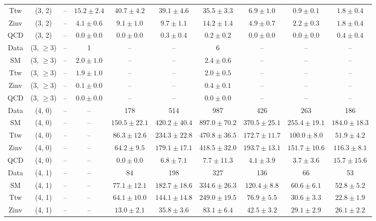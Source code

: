 \begin{table}[h!]
{\begin{tabular}{cccccccccc}
	Ttw & (3, 2) & -- & $15.2\pm 2.4$ & $40.7\pm 4.2$ & $39.1\pm 4.6$ & $35.5\pm 3.3$ & $6.9\pm 1.0$ & $0.9\pm 0.1$ & $1.8\pm 0.4$ \\[0.5ex] 
	Zinv & (3, 2) & -- & $4.1\pm 0.6$ & $9.1\pm 1.0$ & $9.7\pm 1.1$ & $14.2\pm 1.4$ & $4.9\pm 0.7$ & $2.2\pm 0.3$ & $1.8\pm 0.4$ \\[0.5ex] 
	QCD & (3, 2) & -- & $0.0\pm 0.0$ & $0.0\pm 0.0$ & $0.3\pm 0.4$ & $0.2\pm 0.2$ & $0.0\pm 0.0$ & $0.0\pm 0.0$ & $0.4\pm 0.4$ \\[0.5ex] 
	Data & (3, $\ge3$) & -- & 1 & -- & -- & 6 & -- & -- & -- \\[0.5ex] 
	SM & (3, $\ge3$) & -- & $2.0\pm 1.0$ & -- & -- & $2.4\pm 0.6$ & -- & -- & -- \\[0.5ex] 
	Ttw & (3, $\ge3$) & -- & $1.9\pm 1.0$ & -- & -- & $2.0\pm 0.5$ & -- & -- & -- \\[0.5ex] 
	Zinv & (3, $\ge3$) & -- & $0.1\pm 0.0$ & -- & -- & $0.4\pm 0.1$ & -- & -- & -- \\[0.5ex] 
	QCD & (3, $\ge3$) & -- & $0.0\pm 0.0$ & -- & -- & $0.0\pm 0.0$ & -- & -- & -- \\[0.5ex] 
	Data & (4, 0) & -- & -- & 178 & 514 & 987 & 426 & 263 & 186 \\[0.5ex] 
	SM & (4, 0) & -- & -- & $150.5\pm 22.1$ & $420.2\pm 40.4$ & $897.0\pm 70.2$ & $370.5\pm 25.1$ & $255.4\pm 19.1$ & $184.0\pm 18.3$ \\[0.5ex] 
	Ttw & (4, 0) & -- & -- & $86.3\pm 12.6$ & $234.3\pm 22.8$ & $470.8\pm 36.5$ & $172.7\pm 11.7$ & $100.0\pm 8.0$ & $51.9\pm 4.2$ \\[0.5ex] 
	Zinv & (4, 0) & -- & -- & $64.2\pm 9.5$ & $179.1\pm 17.1$ & $418.5\pm 32.0$ & $193.7\pm 13.1$ & $151.7\pm 10.6$ & $116.3\pm 8.1$ \\[0.5ex] 
	QCD & (4, 0) & -- & -- & $0.0\pm 0.0$ & $6.8\pm 7.1$ & $7.7\pm 11.3$ & $4.1\pm 3.9$ & $3.7\pm 3.6$ & $15.7\pm 15.6$ \\[0.5ex] 
	Data & (4, 1) & -- & -- & 84 & 198 & 327 & 136 & 66 & 53 \\[0.5ex] 
	SM & (4, 1) & -- & -- & $77.1\pm 12.1$ & $182.7\pm 18.6$ & $334.6\pm 26.3$ & $120.4\pm 8.8$ & $60.6\pm 6.1$ & $52.8\pm 5.2$ \\[0.5ex] 
	Ttw & (4, 1) & -- & -- & $64.1\pm 10.0$ & $144.1\pm 14.8$ & $249.0\pm 19.5$ & $76.9\pm 5.5$ & $30.6\pm 3.3$ & $22.8\pm 1.9$ \\[0.5ex] 
	Zinv & (4, 1) & -- & -- & $13.0\pm 2.1$ & $35.8\pm 3.6$ & $83.1\pm 6.4$ & $42.5\pm 3.2$ & $29.1\pm 2.9$ & $26.1\pm 2.2$ \\[0.5ex] 

\end{tabular}}
\end{table}

